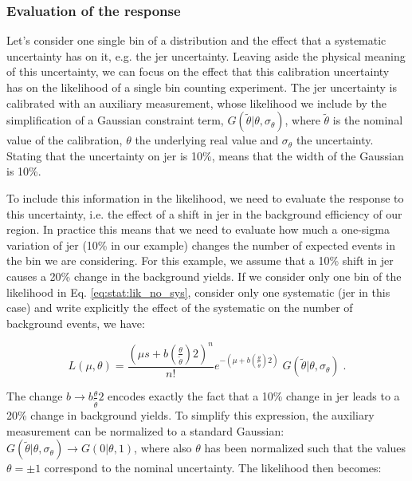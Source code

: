 \subsubsection*{Evaluation of the response}

Let’s consider one single bin of a distribution and the effect that a systematic uncertainty has on it, e.g. the \gls{jer} uncertainty. 
Leaving aside the physical meaning of this uncertainty, we can focus on the effect that this calibration uncertainty has on the likelihood of a single bin counting experiment. 
The \gls{jer} uncertainty is calibrated with an auxiliary measurement, whose likelihood we include by the simplification of a Gaussian constraint term, $G( \tilde{\theta} | \theta, \sigma_\theta)$, where $\tilde{\theta}$ is the nominal value of the calibration, $\theta$ the underlying real value and $\sigma_\theta$ the uncertainty. Stating that the uncertainty on \gls{jer} is 10\%, means that the width of the Gaussian is 10\%. 

To include this information in the likelihood, we need to evaluate the response to this uncertainty, i.e. the effect of a shift in \gls{jer} in the background efficiency of our region.
In practice this means that we need to evaluate how much a one-sigma variation of \gls{jer} (10\% in our example) changes the number of expected events in the bin we are considering. 
For this example, we assume that a 10\% shift in \gls{jer} causes a 20\% change in the background yields.
If we consider only one bin of the likelihood in Eq. \ref{eq:stat:lik_no_sys}, consider only one systematic (\gls{jer} in this case) and write explicitly the effect of the systematic on the number of background events, we have:

\begin{equation}
\label{eq:stat:lik_one_bin_sys_pre}
L(\mu, \theta) =
\frac{ (\mu s +
b \left( \frac{\theta}{\tilde{\theta}} \right) 2 )^{n} }{ n! }
e^{- (\mu  + b\left(\frac{\theta}{\tilde{\theta} }\right)2)}   \; 
G( \tilde{\theta} | \theta, \sigma_\theta) \; .
\end{equation}

\noindent The change $b \rightarrow b\frac{\theta}{\tilde{\theta} }2$ encodes exactly the fact that a 10\% change in \gls{jer} leads to a 20\% change in background yields. To simplify this expression, the auxiliary measurement can be normalized to a standard Gaussian: $G( \tilde{\theta} | \theta, \sigma_\theta) \rightarrow G( 0 | \theta, 1)$, where also $\theta$ has been normalized such that the values $\theta = \pm 1$ correspond to the nominal uncertainty. The likelihood then becomes:


